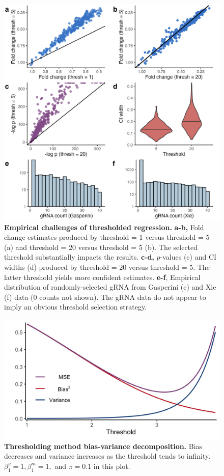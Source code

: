 \documentclass[11pt]{article}
\begin{document}
\clearpage
\begin{figure}[h!]
	\centering
	\includegraphics[width=1\linewidth]{../../figures/thresholding_empirical/plot}
	\caption{\textbf{Empirical challenges of thresholded regression.} \textbf{a-b,} Fold change estimates produced by threshold = 1 versus threshold = 5 (a) and threshold = 20 versus threshold = 5 (b). The selected threshold substantially impacts the results. \textbf{c-d,} $p$-values (c) and CI widths (d) produced by threshold = 20 versus threshold = 5. The latter threshold yields more confident estimates. \textbf{e-f}, Empirical distribution of randomly-selected gRNA from Gasperini (e) and Xie (f) data (0 counts not shown). The gRNA data do not appear to imply an obvious threshold selection strategy.}
	\label{thresholding_empirical}
\end{figure}

\clearpage
\begin{figure}[h!]
\centering
\includegraphics[width=0.7\linewidth]{../../figures/thresholding_theoretical/plot}
\caption{\textbf{Thresholding method bias-variance decomposition.} Bias decreases and variance increases as the threshold tends to infinity. $\beta^g_1 = 1, \beta^m_1 = 1,$ and $\pi = 0.1$ in this plot.}
\label{thresholding_theoretical}
\end{figure}
\end{document}

